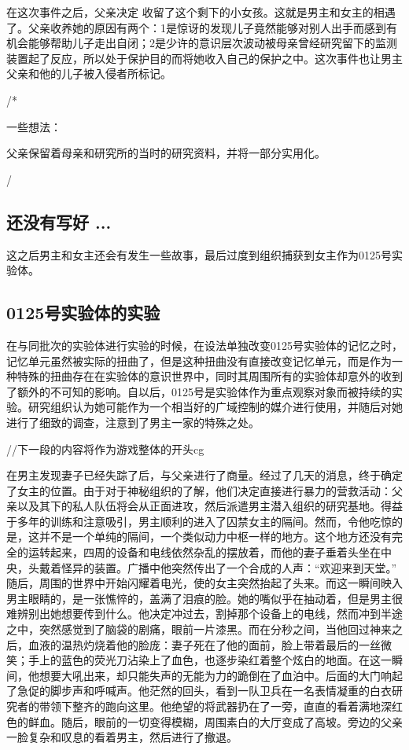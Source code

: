 \documentclass[12pt, a4paper]{article}
\begin{document}
        在这次事件之后，父亲决定    收留了这个剩下的小女孩。这就是男主和女主的相遇了。父亲收养她的原因有两个：1是惊讶的发现儿子竟然能够对别人出手而感到有机会能够帮助儿子走出自闭；2是少许的意识层次波动被母亲曾经研究留下的监测装置起了反应，所以处于保护目的而将她收入自己的保护之中。这次事件也让男主父亲和他的儿子被入侵者所标记。

        \noindent /*

            一些想法：

            父亲保留着母亲和研究所的当时的研究资料，并将一部分实用化。

        \noindent */

    \subsection*{还没有写好 ...}
        这之后男主和女主还会有发生一些故事，最后过度到组织捕获到女主作为0125号实验体。


    \subsection*{0125号实验体的实验}

    在与同批次的实验体进行实验的时候，在设法单独改变0125号实验体的记忆之时，记忆单元虽然被实际的扭曲了，但是这种扭曲没有直接改变记忆单元，而是作为一种特殊的扭曲存在在实验体的意识世界中，同时其周围所有的实验体却意外的收到了额外的不可知的影响。自以后，0125号是实验体作为重点观察对象而被持续的实验。研究组织认为她可能作为一个相当好的广域控制的媒介进行使用，并随后对她进行了细致的调查，注意到了男主一家的特殊之处。

    //下一段的内容将作为游戏整体的开头cg

    在男主发现妻子已经失踪了后，与父亲进行了商量。经过了几天的消息，终于确定了女主的位置。由于对于神秘组织的了解，他们决定直接进行暴力的营救活动：父亲以及其下的私人队伍将会从正面进攻，然后派遣男主潜入组织的研究基地。得益于多年的训练和注意吸引，男主顺利的进入了囚禁女主的隔间。然而，令他吃惊的是，这并不是一个单纯的隔间，一个类似动力中枢一样的地方。这个地方还没有完全的运转起来，四周的设备和电线依然杂乱的摆放着，而他的妻子垂着头坐在中央，头戴着怪异的装置。广播中他突然传出了一个合成的人声：“欢迎来到天堂。” 随后，周围的世界中开始闪耀着电光，使的女主突然抬起了头来。而这一瞬间映入男主眼睛的，是一张憔悴的，盖满了泪痕的脸。她的嘴似乎在抽动着，但是男主很难辨别出她想要传到什么。他决定冲过去，割掉那个设备上的电线，然而冲到半途之中，突然感觉到了脑袋的剧痛，眼前一片漆黑。而在分秒之间，当他回过神来之后，血液的温热灼烧着他的脸庞：妻子死在了他的面前，脸上带着最后的一丝微笑；手上的蓝色的荧光刀沾染上了血色，也逐步染红着整个炫白的地面。在这一瞬间，他想要大吼出来，却只能失声的无能为力的跪倒在了血泊中。后面的大门响起了急促的脚步声和呼喊声。他茫然的回头，看到一队卫兵在一名表情凝重的白衣研究者的带领下整齐的跑向这里。他绝望的将武器扔在了一旁，直直的看着满地深红色的鲜血。随后，眼前的一切变得模糊，周围素白的大厅变成了高坡。旁边的父亲一脸复杂和叹息的看着男主，然后进行了撤退。
    
\end{document}
